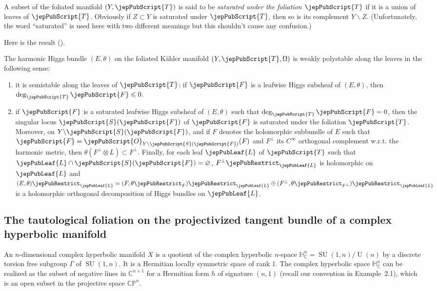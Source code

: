 A subset of the foliated manifold $(Y,\jepPubScript{T})$ is said to be \emph{saturated under the foliation $\jepPubScript{T}$} if it is a union of leaves of $\jepPubScript{T}$. Obviously if $Z\subset Y$ is saturated under $\jepPubScript{T}$, then so is its complement $Y\backslash Z$. (Unfortunately, the word ``saturated'' is used here with two different meanings but this shouldn't cause any confusion.)

Here is the result (\cite[Prop.~2.2]{jep93KM17}).
\begin{proposition}
The harmonic Higgs bundle $(E,\theta)$ on the foliated Kähler manifold $(Y,\jepPubScript{T},\Omega)$ is weakly polystable along the leaves in the following sense:
\begin{enumerate}[label=(\arabic*)]
\item it is semistable along the leaves of $\jepPubScript{T}$: if $\jepPubScript{F}$ is a leafwise Higgs subsheaf of $(E,\theta)$, then $\deg_{\jepPubScript{T}}\jepPubScript{F}\leqslant0$.
\item if $\jepPubScript{F}$ is a saturated leafwise Higgs subsheaf of $(E,\theta)$ such that $\deg_{\jepPubScript{T}}\jepPubScript{F}=0$, then the singular locus $\jepPubScript{S}(\jepPubScript{F})$ of $\jepPubScript{F}$ is saturated under the foliation $\jepPubScript{T}$. Moreover, on $Y\backslash\jepPubScript{S}(\jepPubScript{F})$, and if $F$ denotes the holomorphic subbundle of $E$ such that $\jepPubScript{F}=\jepPubScript{O}_{Y\backslash\jepPubScript{S}(\jepPubScript{F})}(F)$ and $F^\perp$ its $C^\infty$ orthogonal complement w.r.t. the harmonic metric, then $\theta(F^\perp\otimes L)\subset F^\perp$. Finally, for each leaf $\jepPubLeaf{L}$ of $\jepPubScript{T}$ such that $\jepPubLeaf{L}\cap\jepPubScript{S}(\jepPubScript{F})=\varnothing$, $F^\perp\jepPubRestrict_{\jepPubLeaf{L}}$ is holomorphic on $\jepPubLeaf{L}$ and $(E,\theta)\jepPubRestrict_{\jepPubLeaf{L}}=(F,\theta\jepPubRestrict_F)\jepPubRestrict_{\jepPubLeaf{L}}\oplus(F^\perp,\theta\jepPubRestrict_{F^\perp})\jepPubRestrict_{\jepPubLeaf{L}}$ is a holomorphic orthogonal decomposition of Higgs bundles on $\jepPubLeaf{L}$.
\end{enumerate}
\end{proposition}
\subsection{The tautological foliation on the projectivized tangent bundle of a complex hyperbolic manifold}
An $n$-dimensional complex hyperbolic manifold $X$ is a quotient of the complex hyperbolic $n$-space $\mathbb H^n_{\mathbb C}=\operatorname{SU}(1,n)/\operatorname U(n)$ by a discrete torsion free subgroup $\Gamma$ of $\operatorname{SU}(1,n)$. It is a Hermitian locally symmetric space of rank 1. The complex hyperbolic space $\mathbb H^n_{\mathbb C}$ can be realized as the subset of negative lines in $\mathbb C^{n+1}$ for a Hermitian form $h$ of signature $(n,1)$ (recall our convention in Example~2.1), which is an open subset in the projective space $\mathbb{CP}^n$.

